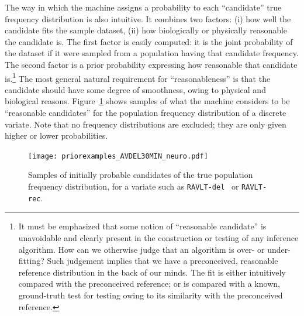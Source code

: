 \documentclass[utf8]{FrontiersinHarvard} %
\renewcommand*{\|}[1][]{\nonscript\:#1\vert\nonscript\:\mathopen{}}
\newcommand*{\ravltdel}{\texttt{RAVLT-del}}
\newcommand*{\ravltrec}{\texttt{RAVLT-rec}}
\begin{document}
The way in which the machine assigns a probability to each \enquote{candidate} true frequency distribution is also intuitive. It combines two factors: (i) how well the candidate fits the sample dataset, (ii) how biologically or physically reasonable the candidate is. The first factor is easily computed: it is the joint probability of the dataset if it were sampled from a population having that candidate frequency. The second factor is a prior probability expressing how reasonable that candidate is.\footnote{It must be emphasized that some notion of \enquote{reasonable candidate} is unavoidable and clearly present in the construction or testing of any inference algorithm. How can we otherwise judge that an algorithm is over- or under-fitting? Such judgement implies that we have a preconceived, reasonable reference distribution in the back of our minds. The fit is either intuitively compared with the preconceived reference; or is compared with a known, ground-truth test for testing owing to its similarity with the preconceived reference.} The most general natural requirement for \enquote{reasonableness} is that the candidate should have some degree of smoothness, owing to physical and biological reasons. Figure~\ref{fig:prior_distribution} shows samples of what the machine considers to be \enquote{reasonable candidates} for the population frequency distribution of a discrete variate. Note that no frequency distributions are excluded; they are only given higher or lower probabilities.
\begin{figure}[t]
  \centering%
  \texttt{[image: priorexamples\_AVDEL30MIN\_neuro.pdf]}
  \caption{Samples of initially probable candidates of the true population frequency distribution, for a variate such as \ravltdel\ %
    or \ravltrec.%
}\label{fig:prior_distribution}
\end{figure}%
\end{document}
